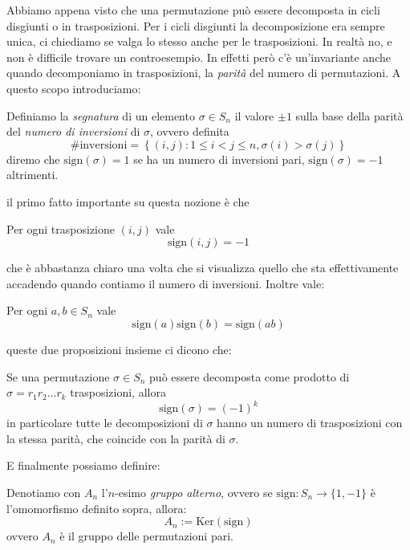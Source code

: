\documentclass[11pt]{scrartcl}
\renewcommand{\ker}[1]{\text{Ker}\!\left(#1\right)}
\begin{document}
	Abbiamo appena visto che una permutazione può essere decomposta in cicli disgiunti o in trasposizioni. Per i cicli disgiunti la decomposizione era sempre unica, ci chiediamo se valga lo stesso anche per le trasposizioni. In realtà no, e non è difficile trovare un controesempio. In effetti però c'è un'invariante anche quando decomponiamo in trasposizioni, la \textit{parità} del numero di permutazioni. A questo scopo introduciamo:
	\begin{definition}[Segnatura]
		Definiamo la \textit{segnatura} di un elemento $\sigma \in S_n$ il valore $\pm 1$ sulla base della parità del \textit{numero di inversioni} di $\sigma$, ovvero definita
		$$\#\text{inversioni}=\left\{(i,j):1\le i<j\le n,\sigma(i)>\sigma(j) \right\}$$
		diremo che $\text{sign}(\sigma)=1$ se ha un numero di inversioni pari, $\text{sign}(\sigma)=-1$ altrimenti. 
	\end{definition}
	il primo fatto importante su questa nozione è che
	\begin{proposition}
		Per ogni trasposizione $(i,j)$ vale
		$$\text{sign}(i,j)=-1$$
	\end{proposition}
	che è abbastanza chiaro una volta che si visualizza quello che sta effettivamente accadendo quando contiamo il numero di inversioni. Inoltre vale:
	\begin{proposition}
		Per ogni $a,b\in S_n$ vale
		$$\text{sign}(a)\text{sign}(b)=\text{sign}(ab)$$
	\end{proposition}
	queste due proposizioni insieme ci dicono che:
	\begin{lemma}
		Se una permutazione $\sigma\in S_n$ può essere decomposta come prodotto di  $\sigma=r_1r_2\dots r_k$ trasposizioni, allora 
		$$\text{sign}(\sigma)=(-1)^k$$
		in particolare tutte le decomposizioni di $\sigma$ hanno un numero di trasposizioni con la stessa parità, che coincide con la parità di $\sigma$.
	\end{lemma}
	E finalmente possiamo definire:
	\begin{definition}
		Denotiamo con $A_n$ l'$n$-esimo \textit{gruppo alterno}, ovvero se $\text{sign}:S_n\to \{1,-1\}$ è l'omomorfismo definito sopra, allora:
		$$A_n:=\ker{\text{sign}}$$
		ovvero $A_n$ è il gruppo delle permutazioni pari.
	\end{definition}
	
	\newpage
	
\end{document}
